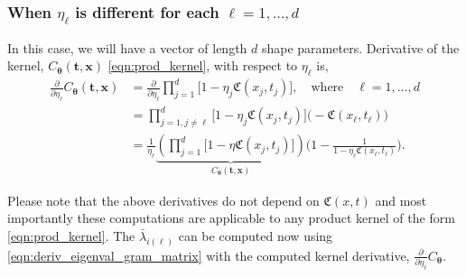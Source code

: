 \documentclass{svjour3}                     %
\newcommand{\bm}[1]{\boldsymbol{#1}}
\newcommand{\vtheta}{{\bm{\theta}}}
\newcommand{\vt}{\bm{t}}
\newcommand{\vx}{\bm{x}}
\begin{document}
\subsubsection{When $\eta_\ell$ is different for each $\ell = 1,\dots,d$}
In this case, we will have a vector of length $d$ shape parameters. Derivative of the kernel, $C_\vtheta(\vt, \vx)$ \eqref{eqn:prod_kernel}, with respect to $\eta_\ell$ is,
\begin{align*}
\frac{\partial}{\partial \eta_\ell} C_\vtheta(\vt, \vx) 
& =
\frac{\partial}{\partial \eta_\ell} 
\prod_{j=1}^d \biggl[
1 - \eta_j \mathfrak{C}(x_j,t_j) \biggr], \quad \text{where} \quad \ell = 1, \dots, d
\\
& = 
\prod_{j=1, j \neq \ell}^d \biggl[
1 - \eta_j \mathfrak{C}(x_j,t_j) \biggr]
\biggl( - \mathfrak{C}(x_\ell,t_\ell) \biggr)
\\
& =
\frac{1}{\eta_\ell} 
\underbrace{
	\left(
	\prod_{j=1}^d \biggl[
	1 - \eta \mathfrak{C}(x_j,t_j) \biggr]
	\right) }_
{ C_\vtheta(\vt, \vx) }
\biggl(
1 - 
\frac{1}
{ 1 - \eta_\ell \mathfrak{C}(x_\ell, t_\ell) }
\biggr) 
.
\end{align*}

Please note that the above derivatives do not depend on $\mathfrak{C}(x,t)$ and most importantly these computations are applicable to any product kernel of the form \eqref{eqn:prod_kernel}.
The $\bar{\lambda}_{i(\ell)}$ can be computed now using \eqref{eqn:deriv_eigenval_gram_matrix} with the computed kernel derivative, $\frac{\partial}{\partial \eta_\ell} C_\vtheta$.
\end{document}
